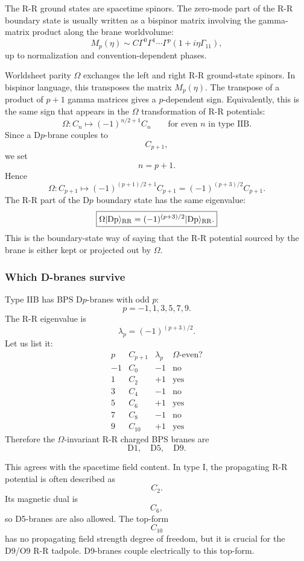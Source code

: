 \documentclass[
  10pt,
  a4paper,
  openany]{book}
\begin{document}
The R-R ground states are spacetime spinors. The zero-mode part of the
R-R boundary state is usually written as a bispinor matrix involving the
gamma-matrix product along the brane worldvolume: \[
M_p(\eta)
\sim
C\Gamma^0\Gamma^1\cdots\Gamma^p
\left(1+i\eta\Gamma_{11}\right),
\] up to normalization and convention-dependent phases.

Worldsheet parity \(\Omega\) exchanges the left and right R-R
ground-state spinors. In bispinor language, this transposes the matrix
\(M_p(\eta)\). The transpose of a product of \(p+1\) gamma matrices
gives a \(p\)-dependent sign. Equivalently, this is the same sign that
appears in the \(\Omega\) transformation of R-R potentials: \[
\Omega:
C_n
\longmapsto
(-1)^{n/2+1}C_n
\qquad
\text{for even }n\text{ in type IIB}.
\] Since a D\(p\)-brane couples to \[
C_{p+1},
\] we set \[
n=p+1.
\] Hence \[
\Omega:
C_{p+1}
\longmapsto
(-1)^{(p+1)/2+1}C_{p+1}
=
(-1)^{(p+3)/2}C_{p+1}.
\] The R-R part of the D\(p\) boundary state has the same eigenvalue: \[
\boxed{
\Omega |{\rm Dp}\rangle_{\mathrm{RR}}
=
(-1)^{(p+3)/2}
|{\rm Dp}\rangle_{\mathrm{RR}}.
}
\] This is the boundary-state way of saying that the R-R potential
sourced by the brane is either kept or projected out by \(\Omega\).

\subsubsection{Which D-branes survive}\label{which-d-branes-survive}

Type IIB has BPS D\(p\)-branes with odd \(p\): \[
p=-1,1,3,5,7,9.
\] The R-R eigenvalue is \[
\lambda_p
=
(-1)^{(p+3)/2}.
\] Let us list it: \[
\begin{array}{c|c|c|c}
p & C_{p+1} & \lambda_p & \Omega\text{-even?}\\
\hline
-1 & C_0 & -1 & \text{no}\\
1 & C_2 & +1 & \text{yes}\\
3 & C_4 & -1 & \text{no}\\
5 & C_6 & +1 & \text{yes}\\
7 & C_8 & -1 & \text{no}\\
9 & C_{10} & +1 & \text{yes}
\end{array}
\] Therefore the \(\Omega\)-invariant R-R charged BPS branes are \[
\boxed{
\mathrm{D1},\quad \mathrm{D5},\quad \mathrm{D9}.
}
\]

This agrees with the spacetime field content. In type I, the propagating
R-R potential is often described as \[
C_2.
\] Its magnetic dual is \[
C_6,
\] so D5-branes are also allowed. The top-form \[
C_{10}
\] has no propagating field strength degree of freedom, but it is
crucial for the D9/O9 R-R tadpole. D9-branes couple electrically to this
top-form.
\end{document}
